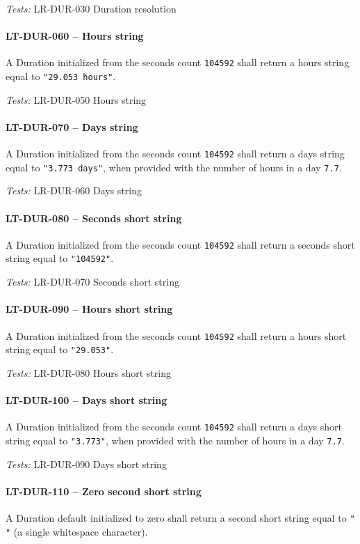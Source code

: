 \textit{Tests: } LR-DUR-030 Duration resolution

\paragraph{LT-DUR-060 -- Hours string}
A Duration initialized from the seconds count \lstinline{104592}
shall return a hours string equal to \lstinline{"29.053 hours"}.

\textit{Tests: } LR-DUR-050 Hours string

\paragraph{LT-DUR-070 -- Days string}
A Duration initialized from the seconds count \lstinline{104592}
shall return a days string equal to \lstinline{"3.773 days"},
when provided with the number of hours in a day \lstinline{7.7}.

\textit{Tests: } LR-DUR-060 Days string

\paragraph{LT-DUR-080 -- Seconds short string}
A Duration initialized from the seconds count \lstinline{104592}
shall return a seconds short string equal to \lstinline{"104592"}.

\textit{Tests: } LR-DUR-070 Seconds short string

\paragraph{LT-DUR-090 -- Hours short string}
A Duration initialized from the seconds count \lstinline{104592}
shall return a hours short string equal to \lstinline{"29.053"}.

\textit{Tests: } LR-DUR-080 Hours short string

\paragraph{LT-DUR-100 -- Days short string}
A Duration initialized from the seconds count \lstinline{104592}
shall return a days short string equal to \lstinline{"3.773"},
when provided with the number of hours in a day \lstinline{7.7}.

\textit{Tests: } LR-DUR-090 Days short string

\paragraph{LT-DUR-110 -- Zero second short string}
A Duration default initialized to zero shall return a second short
string equal to \lstinline{" "} (a single whitespace character).

